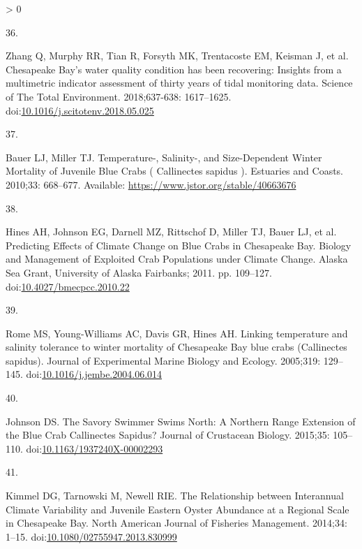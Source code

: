 \documentclass[
  10pt,
]{article}
\newlength{\cslhangindent}
\newlength{\csllabelwidth}
\newenvironment{CSLReferences}[2] %
 {%
  \setlength{\parindent}{0pt}
  \ifodd #1 \everypar{\setlength{\hangindent}{\cslhangindent}}\ignorespaces\fi
  \ifnum #2 > 0
  \setlength{\parskip}{#2\baselineskip}
  \fi
 }%
 {}
\newcommand{\CSLLeftMargin}[1]{\parbox[t]{\csllabelwidth}{#1}}
\newcommand{\CSLRightInline}[1]{\parbox[t]{\linewidth - \csllabelwidth}{#1}\break}
\begin{document}
\begin{CSLReferences}{0}{0}
\leavevmode\hypertarget{ref-zhang_chesapeake_2018}{}%
\CSLLeftMargin{36. }
\CSLRightInline{Zhang Q, Murphy RR, Tian R, Forsyth MK, Trentacoste EM,
Keisman J, et al. Chesapeake {Bay}'s water quality condition has been
recovering: {Insights} from a multimetric indicator assessment of thirty
years of tidal monitoring data. Science of The Total Environment.
2018;637-638: 1617--1625.
doi:\href{https://doi.org/10.1016/j.scitotenv.2018.05.025}{10.1016/j.scitotenv.2018.05.025}}

\leavevmode\hypertarget{ref-bauer_temperature-_2010}{}%
\CSLLeftMargin{37. }
\CSLRightInline{Bauer LJ, Miller TJ. Temperature-, {Salinity}-, and
{Size}-{Dependent} {Winter} {Mortality} of {Juvenile} {Blue} {Crabs} (
{Callinectes} sapidus ). Estuaries and Coasts. 2010;33: 668--677.
Available: \url{https://www.jstor.org/stable/40663676}}

\leavevmode\hypertarget{ref-hines_predicting_2011}{}%
\CSLLeftMargin{38. }
\CSLRightInline{Hines AH, Johnson EG, Darnell MZ, Rittschof D, Miller
TJ, Bauer LJ, et al. Predicting {Effects} of {Climate} {Change} on
{Blue} {Crabs} in {Chesapeake} {Bay}. Biology and {Management} of
{Exploited} {Crab} {Populations} under {Climate} {Change}. Alaska Sea
Grant, University of Alaska Fairbanks; 2011. pp. 109--127.
doi:\href{https://doi.org/10.4027/bmecpcc.2010.22}{10.4027/bmecpcc.2010.22}}

\leavevmode\hypertarget{ref-rome_linking_2005}{}%
\CSLLeftMargin{39. }
\CSLRightInline{Rome MS, Young-Williams AC, Davis GR, Hines AH. Linking
temperature and salinity tolerance to winter mortality of {Chesapeake}
{Bay} blue crabs ({Callinectes} sapidus). Journal of Experimental Marine
Biology and Ecology. 2005;319: 129--145.
doi:\href{https://doi.org/10.1016/j.jembe.2004.06.014}{10.1016/j.jembe.2004.06.014}}

\leavevmode\hypertarget{ref-johnson_savory_2015}{}%
\CSLLeftMargin{40. }
\CSLRightInline{Johnson DS. The {Savory} {Swimmer} {Swims} {North}: {A}
{Northern} {Range} {Extension} of the {Blue} {Crab} {Callinectes}
{Sapidus}? Journal of Crustacean Biology. 2015;35: 105--110.
doi:\href{https://doi.org/10.1163/1937240X-00002293}{10.1163/1937240X-00002293}}

\leavevmode\hypertarget{ref-kimmel_relationship_2014}{}%
\CSLLeftMargin{41. }
\CSLRightInline{Kimmel DG, Tarnowski M, Newell RIE. The {Relationship}
between {Interannual} {Climate} {Variability} and {Juvenile} {Eastern}
{Oyster} {Abundance} at a {Regional} {Scale} in {Chesapeake} {Bay}.
North American Journal of Fisheries Management. 2014;34: 1--15.
doi:\href{https://doi.org/10.1080/02755947.2013.830999}{10.1080/02755947.2013.830999}}


\end{CSLReferences}
\end{document}
